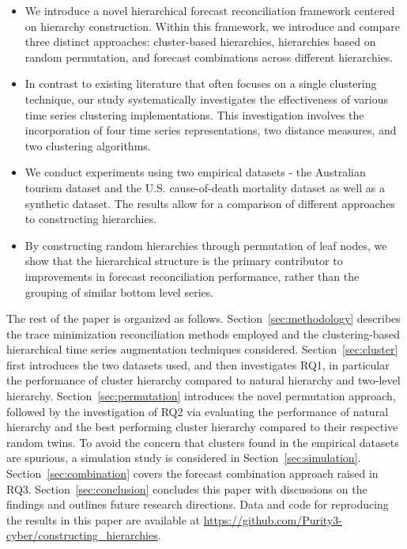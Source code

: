 \documentclass[a4paper,review,12pt,authoryear]{elsarticle}
\begin{document}
\begin{itemize}
  \item We introduce a novel hierarchical forecast reconciliation framework centered on hierarchy construction.  Within this framework, we introduce and compare three distinct approaches: cluster-based hierarchies, hierarchies based on random permutation, and  forecast combinations across different hierarchies.
  \item In contrast to existing literature that often focuses on a single clustering technique, our study systematically investigates the effectiveness of various time series clustering implementations. This investigation involves the incorporation of four time series representations, two distance measures, and two clustering algorithms.
  \item We conduct experiments using two empirical datasets - the Australian tourism dataset and the U.S. cause-of-death mortality dataset as well as a synthetic dataset. The results allow for a comparison of different approaches to constructing hierarchies.
  \item By constructing random hierarchies through permutation of leaf nodes, we show that the hierarchical structure is the primary contributor to improvements in forecast reconciliation performance, rather than the grouping of similar bottom level series. 

\end{itemize}

The rest of the paper is organized as follows. Section~\ref{sec:methodology} describes the trace minimization reconciliation methods employed and the clustering-based hierarchical time series augmentation techniques considered. Section~\ref{sec:cluster} first introduces the two datasets used, and then investigates RQ1, in particular the performance of cluster hierarchy compared to natural hierarchy and two-level hierarchy. Section~\ref{sec:permutation} introduces the novel permutation approach, followed by the investigation of RQ2 via evaluating the performance of natural hierarchy and the best performing cluster hierarchy compared to their respective random twins. To avoid the concern that clusters found in the empirical datasets are spurious, a simulation study is considered in Section~\ref{sec:simulation}. Section~\ref{sec:combination} covers the forecast combination approach raised in RQ3. Section~\ref{sec:conclusion} concludes this paper with discussions on the findings and outlines future research directions. 
Data and code for reproducing the results in this paper are available at \url{https://github.com/Purity3-cyber/constructing_hierarchies}.
\end{document}
